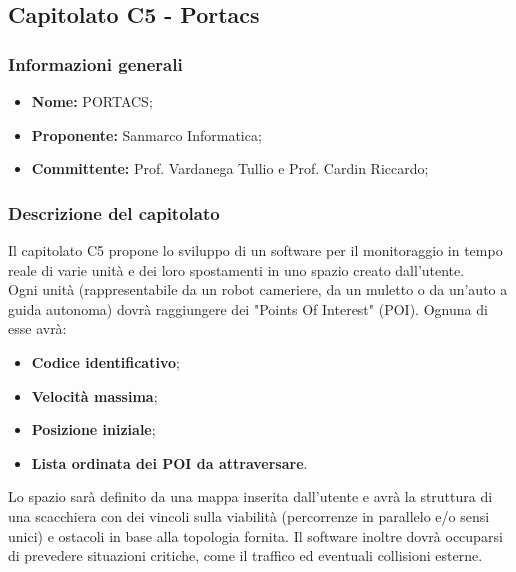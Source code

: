 \subsection{Capitolato C5 - Portacs}
\subsubsection{Informazioni generali}
	\begin{itemize}
	\item \textbf{Nome:} PORTACS;
	\item \textbf{Proponente:} Sanmarco Informatica;
	\item \textbf{Committente:}  Prof. Vardanega Tullio e Prof. Cardin Riccardo;
	\end{itemize}
\subsubsection{Descrizione del capitolato}
Il capitolato C5 propone lo sviluppo di un software per il monitoraggio in tempo reale di varie unità e dei loro spostamenti in uno spazio creato dall'utente. \\
Ogni unità (rappresentabile da un robot cameriere, da un muletto o da un'auto a guida autonoma) dovrà raggiungere dei "Points Of Interest" (POI).
Ognuna di esse avrà: 
\begin{itemize}
	\item \textbf{Codice identificativo};
	\item \textbf{Velocità massima};
	\item \textbf{Posizione iniziale};
	\item \textbf{Lista ordinata dei POI da attraversare}.
\end{itemize}
Lo spazio sarà definito da una mappa inserita dall'utente e avrà la struttura di una scacchiera con dei vincoli sulla viabilità (percorrenze in parallelo e/o sensi unici) e ostacoli in base alla topologia fornita.
Il software inoltre dovrà occuparsi di prevedere situazioni critiche, come il traffico ed eventuali collisioni esterne.

